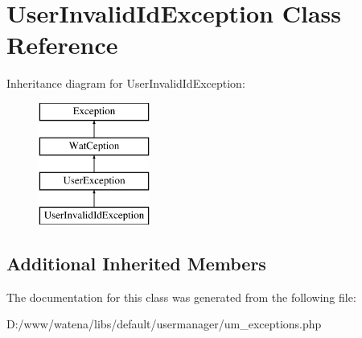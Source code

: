 \hypertarget{class_user_invalid_id_exception}{\section{User\-Invalid\-Id\-Exception Class Reference}
\label{class_user_invalid_id_exception}
}
Inheritance diagram for User\-Invalid\-Id\-Exception\-:\begin{figure}[H]
\begin{center}
\leavevmode
\includegraphics[height=4.000000cm]{class_user_invalid_id_exception}
\end{center}
\end{figure}
\subsection*{Additional Inherited Members}


The documentation for this class was generated from the following file\-:\begin{DoxyCompactItemize}
\item 
D\-:/www/watena/libs/default/usermanager/um\-\_\-exceptions.\-php\end{DoxyCompactItemize}
